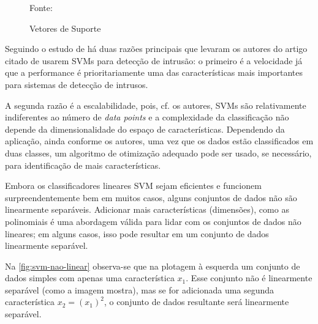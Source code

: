 \begin{figure}[h!]
	\centering
	\caption{Vetores de Suporte}
	
	\label{fig:svm}
	{\scriptsize 	Fonte: }
\end{figure}

Seguindo o estudo de  há duas razões principais que levaram os autores do artigo citado de usarem SVMs para detecção de intrusão: o primeiro é a velocidade já que a performance é prioritariamente uma das características mais importantes para sistemas de detecção de intrusos. 

A segunda razão é a escalabilidade, pois, cf. os autores, SVMs são relativamente indiferentes ao número de \textit{data points} e a complexidade da classificação não depende da dimensionalidade do espaço de características. Dependendo da aplicação, ainda conforme os autores, uma vez que os dados estão classificados em duas classes, um algoritmo de otimização adequado pode ser usado, se necessário,  para identificação de mais características.

Embora os classificadores lineares SVM sejam eficientes e funcionem surpreendentemente bem em muitos casos, alguns conjuntos de dados não são linearmente separáveis. Adicionar mais características (dimensões), como as polinomiais é uma abordagem válida para lidar com os conjuntos de dados não lineares; em alguns casos, isso pode resultar em um conjunto de dados linearmente separável. \cite[p. 153]{geron_maos_2020}

Na \autoref{fig:svm-nao-linear} observa-se que na plotagem à esquerda um conjunto de dados simples com apenas uma característica $ x_1$. Esse conjunto não é linearmente separável (como a imagem mostra), mas se for adicionada uma segunda característica $ x_2 = (x_1)^2 $, o conjunto de dados resultante será linearmente separável.

